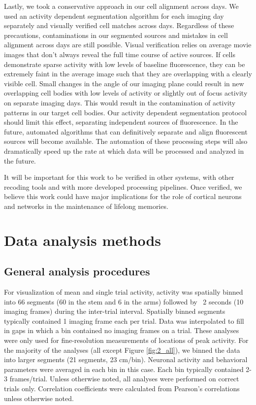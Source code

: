 \bigskip

Lastly, we took a conservative approach in our cell alignment across days. We used an activity dependent segmentation algorithm for each imaging day separately and visually verified cell matches across days. Regardless of these precautions, contaminations in our segmented sources and mistakes in cell alignment across days are still possible. Visual verification relies on average movie images that don't always reveal the full time course of active sources. If cells demonstrate sparse activity with low levels of baseline fluorescence, they can be extremely faint in the average image such that they are overlapping with a clearly visible cell. Small changes in the angle of our imaging plane could result in new overlapping cell bodies with low levels of activity or slightly out of focus activity on separate imaging days. This would result in the contamination of activity patterns in our target cell bodies. Our activity dependent segmentation protocol should limit this effect, separating independent sources of fluorescence. In the future, automated algorithms that can definitively separate and align fluorescent sources will become available. The automation of these processing steps will also dramatically speed up the rate at which data will be processed and analyzed in the future. 

It will be important for this work to be verified in other systems, with other recoding tools and with more developed processing pipelines. Once verified, we believe this work could have major implications for the role of cortical neurons and networks in the maintenance of lifelong memories.


\section{Data analysis methods}
\subsection{General analysis procedures}
For visualization of mean and single trial activity, activity was spatially binned into 66 segments (60 in the stem and 6 in the arms) followed by ~2 seconds (10 imaging frames) during the inter-trial interval. Spatially binned segments typically contained 1 imaging frame each per trial. Data was interpolated to fill in gaps in which a bin contained no imaging frames on a trial. These analyses were only used for fine-resolution measurements of locations of peak activity. For the majority of the analyses (all except Figure \ref{fig:2_all}), we binned the data into larger segments (21 segments, 23 cm/bin). Neuronal activity and behavioral parameters were averaged in each bin in this case. Each bin typically contained 2-3 frames/trial. Unless otherwise noted, all analyses were performed on correct trials only. Correlation coefficients were calculated from Pearson's correlations unless otherwise noted.

